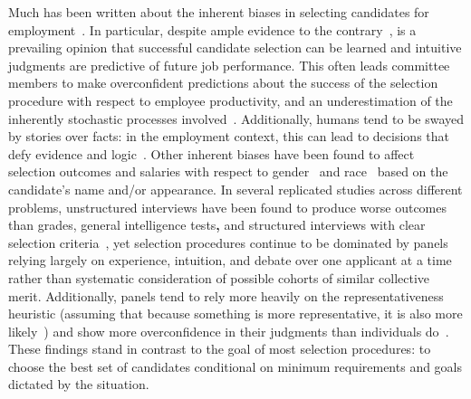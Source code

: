 \documentclass[12pt]{article}
\begin{document}
Much has been written about the inherent biases in selecting candidates for employment~\cite{reskin2000,riach2002,gorman2005,pager2005,krieger2006,rooth2010,kuncel2013}. In particular, despite ample evidence to the contrary~\cite{grove1996,grove2000}, is a prevailing opinion that successful candidate selection can be learned and intuitive judgments are predictive of future job performance. 
This often leads committee members to make overconfident predictions about the success of the selection procedure with respect to employee productivity, and an underestimation of the inherently stochastic processes involved~\cite{pulakos1996,kausel2016}. Additionally, humans tend to be swayed by stories over facts: in the employment context, this can lead to decisions that defy evidence and logic~\cite{highhouse1998}. Other inherent biases have been found to affect selection outcomes and salaries with respect to gender~\cite{mossracusin2012,reuben2014} and race~\cite{bertrand2004,lavergne2004} based on the candidate's name and/or appearance. In several replicated studies across different problems, unstructured interviews have been found to produce worse outcomes than grades, general intelligence tests\textbf{,} and structured interviews with clear selection criteria~\cite{kuncel2013,kausel2016}, yet selection procedures continue to be dominated by panels relying largely on experience, intuition, and debate over one applicant at a time~\cite{rivera2015} rather than systematic consideration of possible cohorts of similar collective merit. Additionally, panels tend to rely more heavily on the representativeness heuristic (assuming that because something is more representative, it is also more likely~\cite{kahnemann1972}) and show  more overconfidence in their judgments than individuals do~\cite{sunstein2015}.
These findings stand in contrast to the goal of most selection procedures: to choose the best set of candidates conditional on minimum requirements and goals dictated by the situation. 
\end{document}
